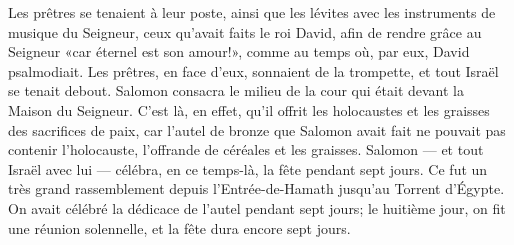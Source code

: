 Les prêtres se tenaient à leur poste,
	ainsi que les lévites avec les instruments de musique du Seigneur,
	ceux qu’avait faits le roi David, afin de rendre grâce au Seigneur
		«car éternel est son amour!»,
	comme au temps où, par eux, David psalmodiait.
Les prêtres, en face d’eux, sonnaient de la trompette, et tout Israël se tenait debout.
Salomon consacra le milieu de la cour qui était devant la Maison du Seigneur.
C’est là, en effet, qu’il offrit les holocaustes et les graisses des sacrifices de paix,
	car l’autel de bronze que Salomon avait fait ne pouvait pas contenir l’holocauste,
	l’offrande de céréales et les graisses.
Salomon --- et tout Israël avec lui ---
	célébra, en ce temps-là, la fête pendant sept jours.
Ce fut un très grand rassemblement depuis l’Entrée-de-Hamath jusqu’au Torrent d’Égypte.
On avait célébré la dédicace de l’autel pendant sept jours;
	le huitième jour, on fit une réunion solennelle, et la fête dura encore sept jours.
